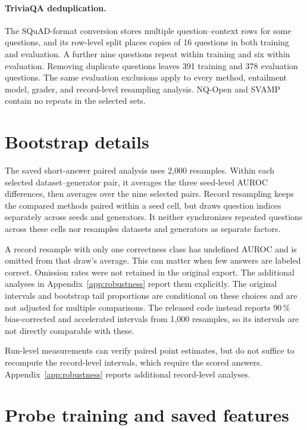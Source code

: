 \paragraph{TriviaQA deduplication.}
\label{app:dedup}
The SQuAD-format conversion stores multiple question--context rows for some
questions, and its row-level split places copies of 16 questions in both
training and evaluation. A further nine questions repeat within training and
six within evaluation. Removing duplicate questions leaves 391 training and
378 evaluation questions. The same evaluation exclusions apply to every
method, entailment model, grader, and record-level resampling analysis.
NQ-Open and SVAMP contain no repeats in the selected sets.

\section{Bootstrap details}
\label{sec:bootstrap-assumptions}

The saved short-answer paired analysis uses 2,000 resamples. Within each selected
dataset--generator pair, it averages the three seed-level AUROC differences,
then averages over the nine selected pairs. Record resampling keeps the
compared methods paired within a seed cell, but draws question indices
separately across seeds and generators. It neither synchronizes repeated
questions across these cells nor resamples datasets and generators as
separate factors.

A record resample with only one correctness class has undefined AUROC and is
omitted from that draw's average. This can matter when few answers are labeled
correct. Omission rates were not retained in the original export. The additional
analyses in Appendix~\ref{app:robustness} report them explicitly. The original
intervals and bootstrap tail
proportions are conditional on these choices and are not adjusted for
multiple comparisons. The released code instead reports 90\,\% bias-corrected
and accelerated intervals from 1{,}000 resamples, so its intervals are not
directly comparable with these.

Run-level measurements can verify paired point estimates, but do not suffice
to recompute the record-level intervals, which require the scored answers.
Appendix~\ref{app:robustness} reports additional record-level
analyses.

\section{Probe training and saved features}
\label{app:probe-training}

